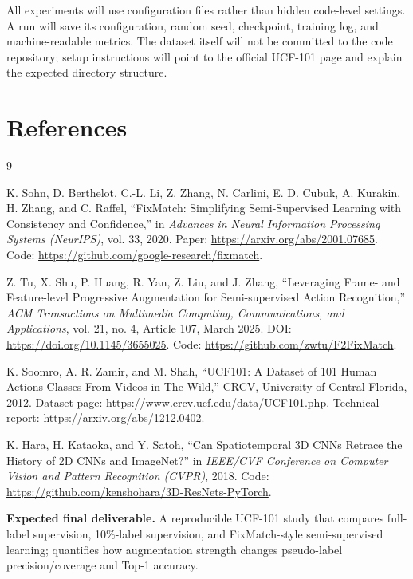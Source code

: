 \documentclass[11pt,a4paper]{article}
\begin{document}
All experiments will use configuration files rather than hidden code-level settings. A run will save its configuration, random seed, checkpoint, training log, and machine-readable metrics. The dataset itself will not be committed to the code repository; setup instructions will point to the official UCF-101 page and explain the expected directory structure.

\section{References}
\begin{thebibliography}{9}

K. Sohn, D. Berthelot, C.-L. Li, Z. Zhang, N. Carlini, E. D. Cubuk, A. Kurakin, H. Zhang, and C. Raffel,
\newblock ``FixMatch: Simplifying Semi-Supervised Learning with Consistency and Confidence,''
\newblock in \emph{Advances in Neural Information Processing Systems (NeurIPS)}, vol. 33, 2020.
\newblock Paper: \url{https://arxiv.org/abs/2001.07685}.
\newblock Code: \url{https://github.com/google-research/fixmatch}.

Z. Tu, X. Shu, P. Huang, R. Yan, Z. Liu, and J. Zhang,
\newblock ``Leveraging Frame- and Feature-level Progressive Augmentation for Semi-supervised Action Recognition,''
\newblock \emph{ACM Transactions on Multimedia Computing, Communications, and Applications}, vol. 21, no. 4, Article 107, March 2025.
\newblock DOI: \url{https://doi.org/10.1145/3655025}.
\newblock Code: \url{https://github.com/zwtu/F2FixMatch}.

K. Soomro, A. R. Zamir, and M. Shah,
\newblock ``UCF101: A Dataset of 101 Human Actions Classes From Videos in The Wild,''
\newblock CRCV, University of Central Florida, 2012.
\newblock Dataset page: \url{https://www.crcv.ucf.edu/data/UCF101.php}.
\newblock Technical report: \url{https://arxiv.org/abs/1212.0402}.

K. Hara, H. Kataoka, and Y. Satoh,
\newblock ``Can Spatiotemporal 3D CNNs Retrace the History of 2D CNNs and ImageNet?''
\newblock in \emph{IEEE/CVF Conference on Computer Vision and Pattern Recognition (CVPR)}, 2018.
\newblock Code: \url{https://github.com/kenshohara/3D-ResNets-PyTorch}.

\end{thebibliography}

\vfill
\begin{keybox}
\textbf{Expected final deliverable.} A reproducible UCF-101 study that compares full-label supervision, 10\%-label supervision, and FixMatch-style semi-supervised learning; quantifies how augmentation strength changes pseudo-label precision/coverage and Top-1 accuracy.
\end{keybox}
\end{document}
